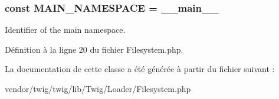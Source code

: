 \subsubsection[{\texorpdfstring{M\+A\+I\+N\+\_\+\+N\+A\+M\+E\+S\+P\+A\+CE}{MAIN_NAMESPACE}}]{\setlength{\rightskip}{0pt plus 5cm}const M\+A\+I\+N\+\_\+\+N\+A\+M\+E\+S\+P\+A\+CE = \textquotesingle{}\+\_\+\+\_\+main\+\_\+\+\_\+\textquotesingle{}}\hypertarget{class_twig___loader___filesystem_af41bf3185112b600125464a5972ecf38}{}\label{class_twig___loader___filesystem_af41bf3185112b600125464a5972ecf38}
Identifier of the main namespace. 

Définition à la ligne 20 du fichier Filesystem.\+php.



La documentation de cette classe a été générée à partir du fichier suivant \+:\begin{DoxyCompactItemize}
\item 
vendor/twig/twig/lib/\+Twig/\+Loader/Filesystem.\+php\end{DoxyCompactItemize}
